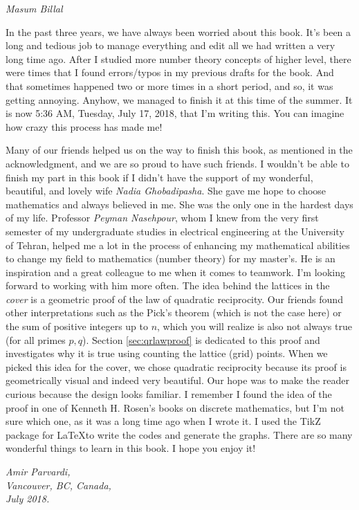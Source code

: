 \documentclass[leqno,12pt]{book}
\begin{document}
\begin{flushright}
	\it Masum Billal
\end{flushright}

\newpage

In the past three years, we have always been worried about this book. It's been a long and tedious job to manage everything and edit all we had written a very long time ago. After I studied more number theory concepts of higher level, there were times that I found errors/typos in my previous drafts for the book. And that sometimes happened two or more times in a short period, and so, it was getting annoying. Anyhow, we managed to finish it at this time of the summer. It is now 5:36 AM, Tuesday, July 17, 2018, that I'm writing this. You can imagine how crazy this process has made me!

\vspace{0.3cm}
Many of our friends helped us on the way to finish this book, as mentioned in the acknowledgment, and we are so proud to have such friends. I wouldn't be able to finish my part in this book if I didn't have the support of my wonderful, beautiful, and lovely wife \textit{Nadia Ghobadipasha}. She gave me hope to choose mathematics and always believed in me. She was the only one in the hardest days of my life.
\vspace{0.3cm}
Professor \textit{Peyman Nasehpour}, whom I knew from the very first semester of my undergraduate studies in electrical engineering at the University of Tehran, helped me a lot in the process of enhancing my mathematical abilities to change my field to mathematics (number theory) for my master's.  He is an inspiration and a great colleague to me when it comes to teamwork. I'm looking forward to working with him more often.
\vspace{0.3cm}
The idea behind the lattices in the \textit{cover} is a geometric proof of the law of quadratic reciprocity. Our friends found other interpretations such as the Pick's theorem (which is not the case here) or the sum of positive integers up to $n$, which you will realize is also not always true (for all primes $p,q$). Section \eqref{sec:qrlawproof} is dedicated to this proof and investigates why it is true using counting the lattice (grid) points. When we picked this idea for the cover, we chose quadratic reciprocity because its proof is geometrically visual and indeed very beautiful. Our hope was to make the reader curious because the design looks familiar. I remember I found the idea of the proof in one of Kenneth H. Rosen's books on discrete mathematics, but I'm not sure which one, as it was a long time ago when I wrote it. I used the TikZ package for \LaTeX to write the codes and generate the graphs.
\vspace{0.3cm}
There are so many wonderful things to learn in this book. I hope you enjoy it!
\begin{flushright}
	\it Amir Parvardi,\\
	Vancouver, BC, Canada,\\
	July 2018.
\end{flushright}
\end{document}
